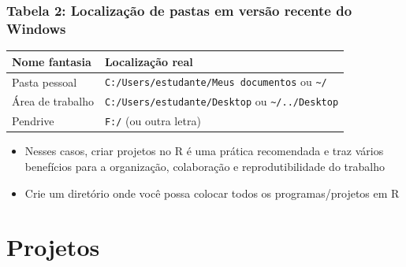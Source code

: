 \documentclass[
  letterpaper,
  DIV=11,
  numbers=noendperiod]{scrartcl}
\begin{document}
\subsubsection{Tabela 2: Localização de pastas em versão recente do
Windows}\label{tabela-2-localizauxe7uxe3o-de-pastas-em-versuxe3o-recente-do-windows}

\begin{longtable}[]{@{}ll@{}}
\toprule\noalign{}
Nome fantasia & Localização real \\
\midrule\noalign{}
\endhead
\bottomrule\noalign{}
\endlastfoot
Pasta pessoal & \texttt{C:/Users/estudante/Meus\ documentos} ou
\texttt{\textasciitilde{}/} \\
Área de trabalho & \texttt{C:/Users/estudante/Desktop} ou
\texttt{\textasciitilde{}/../Desktop} \\
Pendrive & \texttt{F:/} (ou outra letra) \\
\end{longtable}

\begin{itemize}
\item
  Nesses casos, criar projetos no R é uma prática recomendada e traz
  vários benefícios para a organização, colaboração e reprodutibilidade
  do trabalho
\item
  Crie um diretório onde você possa colocar todos os programas/projetos
  em R
\end{itemize}

\section{Projetos}\label{projetos}
\end{document}
